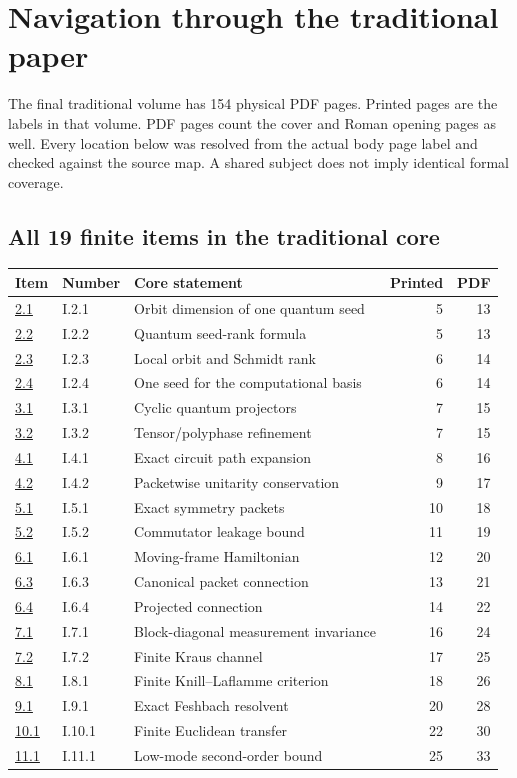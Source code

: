 \section{Navigation through the traditional paper}
\label{sec:traditional-navigation}
The final traditional volume has 154 physical PDF pages. Printed pages are the labels in that volume. PDF pages count the cover and Roman opening pages as well. Every location below was resolved from the actual body page label and checked against the source map. A shared subject does not imply identical formal coverage.

\subsection{All 19 finite items in the traditional core}
\begin{longtable}{@{}p{.10\linewidth}p{.13\linewidth}p{.49\linewidth}rr@{}}\toprule Item & Number & Core statement & Printed & PDF\\\midrule\endhead
\hyperref[result:2.1]{2.1} & I.2.1 & Orbit dimension of one quantum seed & 5 & 13\\
\hyperref[result:2.2]{2.2} & I.2.2 & Quantum seed-rank formula & 5 & 13\\
\hyperref[result:2.3]{2.3} & I.2.3 & Local orbit and Schmidt rank & 6 & 14\\
\hyperref[result:2.4]{2.4} & I.2.4 & One seed for the computational basis & 6 & 14\\
\hyperref[result:3.1]{3.1} & I.3.1 & Cyclic quantum projectors & 7 & 15\\
\hyperref[result:3.2]{3.2} & I.3.2 & Tensor/polyphase refinement & 7 & 15\\
\hyperref[result:4.1]{4.1} & I.4.1 & Exact circuit path expansion & 8 & 16\\
\hyperref[result:4.2]{4.2} & I.4.2 & Packetwise unitarity conservation & 9 & 17\\
\hyperref[result:5.1]{5.1} & I.5.1 & Exact symmetry packets & 10 & 18\\
\hyperref[result:5.2]{5.2} & I.5.2 & Commutator leakage bound & 11 & 19\\
\hyperref[result:6.1]{6.1} & I.6.1 & Moving-frame Hamiltonian & 12 & 20\\
\hyperref[result:6.3]{6.3} & I.6.3 & Canonical packet connection & 13 & 21\\
\hyperref[result:6.4]{6.4} & I.6.4 & Projected connection & 14 & 22\\
\hyperref[result:7.1]{7.1} & I.7.1 & Block-diagonal measurement invariance & 16 & 24\\
\hyperref[result:7.2]{7.2} & I.7.2 & Finite Kraus channel & 17 & 25\\
\hyperref[result:8.1]{8.1} & I.8.1 & Finite Knill--Laflamme criterion & 18 & 26\\
\hyperref[result:9.1]{9.1} & I.9.1 & Exact Feshbach resolvent & 20 & 28\\
\hyperref[result:10.1]{10.1} & I.10.1 & Finite Euclidean transfer & 22 & 30\\
\hyperref[result:11.1]{11.1} & I.11.1 & Low-mode second-order bound & 25 & 33\\
\bottomrule\end{longtable}
